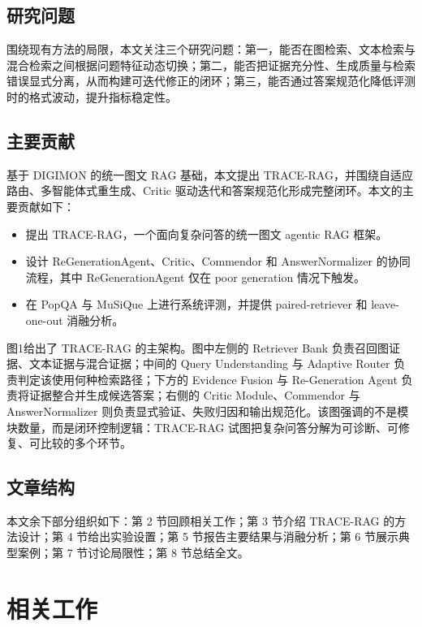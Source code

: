 ﻿\documentclass[UTF8,11pt,twocolumn]{ctexart}
\begin{document}
\subsection{研究问题}

围绕现有方法的局限，本文关注三个研究问题：第一，能否在图检索、文本检索与混合检索之间根据问题特征动态切换；第二，能否把证据充分性、生成质量与检索错误显式分离，从而构建可迭代修正的闭环；第三，能否通过答案规范化降低评测时的格式波动，提升指标稳定性。

\subsection{主要贡献}

基于 DIGIMON 的统一图文 RAG 基础，本文提出 TRACE-RAG，并围绕自适应路由、多智能体式重生成、Critic 驱动迭代和答案规范化形成完整闭环。本文的主要贡献如下：

\begingroup
\raggedright
\begin{itemize}[leftmargin=1.5em]
  \item 提出 TRACE-RAG，一个面向复杂问答的统一图文 agentic RAG 框架。
  \item 设计 ReGenerationAgent、Critic、Commendor 和 AnswerNormalizer 的协同流程，其中 ReGenerationAgent 仅在 poor generation 情况下触发。
  \item 在 PopQA 与 MuSiQue 上进行系统评测，并提供 paired-retriever 和 leave-one-out 消融分析。
\end{itemize}
\endgroup

图1给出了 TRACE-RAG 的主架构。图中左侧的 Retriever Bank 负责召回图证据、文本证据与混合证据；中间的 Query Understanding 与 Adaptive Router 负责判定该使用何种检索路径；下方的 Evidence Fusion 与 Re-Generation Agent 负责将证据整合并生成候选答案；右侧的 Critic Module、Commendor 与 AnswerNormalizer 则负责显式验证、失败归因和输出规范化。该图强调的不是模块数量，而是闭环控制逻辑：TRACE-RAG 试图把复杂问答分解为可诊断、可修复、可比较的多个环节。

\subsection{文章结构}

本文余下部分组织如下：第 2 节回顾相关工作；第 3 节介绍 TRACE-RAG 的方法设计；第 4 节给出实验设置；第 5 节报告主要结果与消融分析；第 6 节展示典型案例；第 7 节讨论局限性；第 8 节总结全文。

\section{相关工作}
\end{document}
